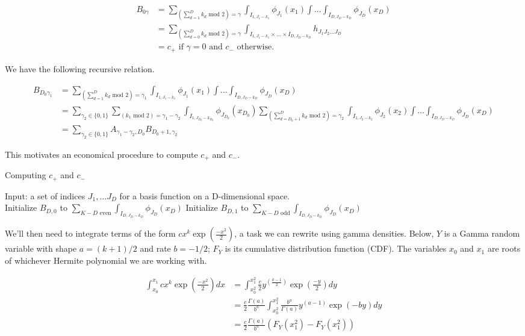 \documentclass{article}
\begin{document}
\begin{align*}
B_{0\gamma}&=\sum_{\left(\sum_{d=1}^D k_d \text{ mod } 2\right) = \gamma} \int_{I_{1,J_1-k_1}}\phi_{J_1}(x_1)\int ... \int_{I_{D,J_D-k_D}}  \phi_{J_D}(x_D) \\ 
&=\sum_{\left(\sum_{d={0}}^D k_d \text{ mod } 2\right) = \gamma} \int_{I_{1,J_1-k_1}\times ... \times I_{D,J_D-k_D}}  h_{J_1 J_2 ... J_D} \\
&= c_+ \text{ if } \gamma=0 \text{ and } c_- \text{ otherwise. }
\end{align*}

We have the following recursive relation.

\begin{align*}
B_{D_0\gamma_1}&=\sum_{\left(\sum_{d=1}^D k_d \text{ mod } 2\right) = \gamma_1} \int_{I_{1,J_1-k_1}}\phi_{J_1}(x_1)\int ... \int_{I_{D,J_D-k_D}}  \phi_{J_D}(x_D) \\
&=\sum_{ \gamma_2 \in \{0,1\}} \sum_{\left(k_1 \text{ mod } 2\right) = \gamma_1 - \gamma_2} \int_{I_{1,J_{D_0}-k_{D_0}}}\phi_{J_{D_0}}(x_{D_0})
\sum_{\left(\sum_{d={D_0+1}}^D k_d \text{ mod } 2\right) = \gamma_2} \int_{I_{1,J_2-k_2}}\phi_{J_2}(x_2)\int ... \int_{I_{D,J_D-k_D}}  \phi_{J_D}(x_D) \\
&=\sum_{ \gamma_2 \in \{0,1\}}  A_{ \gamma_1 - \gamma_2, {D_0}}
B_{{D_0}+1,\gamma_2}
\end{align*}

This motivates an economical procedure to compute $c_+$ and $c_-$. 
\begin{algorithm}[h]
\caption{Computing $c_+$ and $c_-$}
Input: a set of indices $J_1, ... J_D$ for a basis function on a D-dimensional space.\\
Initialize $B_{D,0}$ to $\sum_{K-D \text{ even}} \int_{I_{D,J_D-k_D}}  \phi_{J_D}(x_D)$
Initialize $B_{D,1}$ to $\sum_{K-D \text{ odd}} \int_{I_{D,J_D-k_D}}  \phi_{J_D}(x_D)$
\Indp
\Indm
\end{algorithm}

We'll then need to integrate terms of the form $cx^k\exp(\frac{-x^2}{2})$, a task we can rewrite using gamma densities. Below, $Y$ is a Gamma random variable with shape $a = (k+1)/2$ and rate $b=-1/2$; $F_Y$ is its cumulative distribution function (CDF). The variables $x_0$ and $x_1$ are roots of whichever Hermite polynomial we are working with.

\begin{align*}
\int_{x_0}^{x_1} cx^k\exp(\frac{-x^2}{2})dx 
& =  \int_{x_0^2}^{x_1^2} \frac{c}{2}y^{(\frac{k-1}{2})}\exp(\frac{-y}{2})dy \\
& =  \frac{c}{2} \frac{\Gamma(a)}{b^a} \int_{x_0^2}^{x_1^2} \frac{b^a}{\Gamma(a)}y^{(a-1)}\exp(-by)dy \\
& =  \frac{c}{2} \frac{\Gamma(a)}{b^a} (F_Y(x_1^2)-F_Y(x_1^2))\\
\end{align*}
\end{document}
